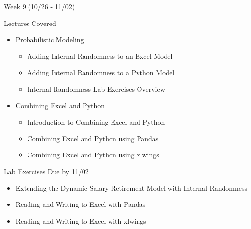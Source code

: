 \documentclass[]{article}
\begin{document}
\begin{section}{Week 9 (10/26 - 11/02)}
\begin{subsection}{Lectures Covered}
\begin{itemize}
\item Probabilistic Modeling
\begin{itemize}
\item Adding Internal Randomness to an Excel Model
\item Adding Internal Randomness to a Python Model
\item Internal Randomness Lab Exercises Overview
\end{itemize}
\end{itemize}
\begin{itemize}
\item Combining Excel and Python
\begin{itemize}
\item Introduction to Combining Excel and Python
\item Combining Excel and Python using Pandas
\item Combining Excel and Python using xlwings
\end{itemize}
\end{itemize}
\end{subsection}
\begin{subsection}{Lab Exercises Due by 11/02}
\begin{itemize}
\item Extending the Dynamic Salary Retirement Model with Internal Randomness
\item Reading and Writing to Excel with Pandas
\item Reading and Writing to Excel with xlwings
\end{itemize}
\end{subsection}
\end{section}
\end{document}

